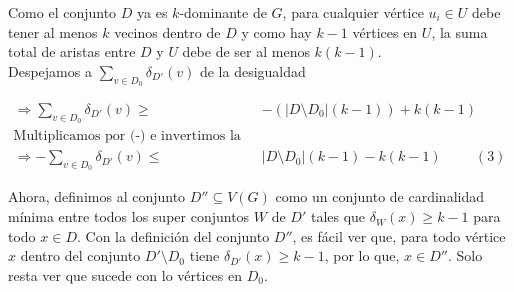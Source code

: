 \documentclass{article}
\begin{document}
Como el conjunto $D$ ya es $k$-dominante de $G$, para cualquier vértice $u_i\in U$ debe tener al menos $k$ vecinos dentro de $D$ y como hay $k-1$ vértices en $U$, la suma total de aristas entre $D$ y $U$ debe de ser al menos $k(k-1)$.\\


Despejamos a $\sum_{v\in D_0}\delta_{D'}(v)$ de la desigualdad

\begin{align*}
\Longrightarrow \sum_{v\in D_0}\delta_{D'}(v)\geq & - (|D\setminus D_0|(k-1)) + k(k-1)\\
\text{Multiplicamos por (-) e invertimos la desigualdad}\\
\Longrightarrow -\sum_{v\in D_0}\delta_{D'}(v)\leq & |D\setminus D_0|(k-1)-k(k-1) \hspace{1cm} (3)
\end{align*}


Ahora, definimos al conjunto $D''\subseteq V(G)$ como un conjunto de cardinalidad mínima entre todos los super conjuntos $W$ de $D'$ tales que $\delta_W(x)\geq k-1$ para todo $x \in D$. Con la definición del conjunto $D''$, es fácil ver que, para todo vértice $x$ dentro del conjunto $D'\setminus D_0$ tiene $\delta_{D'}(x)\geq k-1$, por lo que, $x \in D''$. Solo resta ver que sucede con lo vértices en $D_0$.\\
\end{document}
